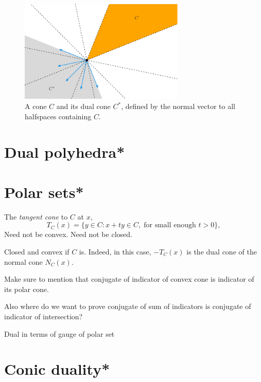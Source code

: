 \begin{figure}[tb]
\centering
\includegraphics[width=0.7\textwidth]{fig/dual_cone.pdf}
\caption{A cone $C$ and its dual cone $C^*$, defined by the normal vector to all
  halfspaces containing $C$.}  
\label{fig:dual_cone}
\end{figure}

\section{Dual polyhedra*}
\label{sec:dual_polyhedra}



\section{Polar sets*}
\label{sec:polar_sets}




  
  The \emph{tangent cone} to $C$ at $x$,
  \begin{equation}
  \label{eq:tangent_cone}
  T_C(x) = \{ y \in C : x + ty \in C, \; \text{for small enough $t>0$} \},
  \end{equation}
  Need not be convex. Need not be closed. 

  Closed and convex if $C$ is. Indeed, in this case, $-T_C(x)$ is the dual cone
  of the normal cone $N_C(x)$.

Make sure to mention that conjugate of indicator of convex cone is indicator of
its polar cone. 

Also where do we want to prove conjugate of sum of indicators is conjugate of
indicator of intersection?

Dual in terms of gauge of polar set 

\section{Conic duality*}
\label{sec:conic_duality}

